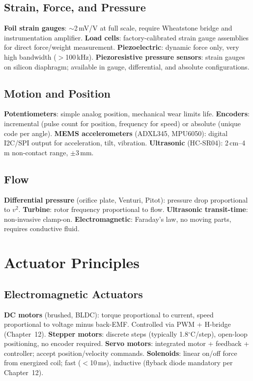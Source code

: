 \documentclass[11pt,letterpaper,twoside,openany]{book}
\newcommand{\degC}{\ensuremath{{}^{\circ}\text{C}}}
\begin{document}
\subsection{Strain, Force, and Pressure}
\textbf{Foil strain gauges}: $\sim$2\,mV/V at full scale, require Wheatstone bridge and instrumentation amplifier. \textbf{Load cells}: factory-calibrated strain gauge assemblies for direct force/weight measurement. \textbf{Piezoelectric}: dynamic force only, very high bandwidth ($>$100\,kHz). \textbf{Piezoresistive pressure sensors}: strain gauges on silicon diaphragm; available in gauge, differential, and absolute configurations.

\subsection{Motion and Position}
\textbf{Potentiometers}: simple analog position, mechanical wear limits life. \textbf{Encoders}: incremental (pulse count for position, frequency for speed) or absolute (unique code per angle). \textbf{MEMS accelerometers} (ADXL345, MPU6050): digital I2C/SPI output for acceleration, tilt, vibration. \textbf{Ultrasonic} (HC-SR04): 2\,cm--4\,m non-contact range, $\pm$3\,mm.

\subsection{Flow}
\textbf{Differential pressure} (orifice plate, Venturi, Pitot): pressure drop proportional to $v^2$. \textbf{Turbine}: rotor frequency proportional to flow. \textbf{Ultrasonic transit-time}: non-invasive clamp-on. \textbf{Electromagnetic}: Faraday's law, no moving parts, requires conductive fluid.

\section{Actuator Principles}

\subsection{Electromagnetic Actuators}
\textbf{DC motors} (brushed, BLDC): torque proportional to current, speed proportional to voltage minus back-EMF. Controlled via PWM + H-bridge (Chapter~12). \textbf{Stepper motors}: discrete steps (typically 1.8\degC{}/step), open-loop positioning, no encoder required. \textbf{Servo motors}: integrated motor + feedback + controller; accept position/velocity commands. \textbf{Solenoids}: linear on/off force from energized coil; fast ($<$10\,ms), inductive (flyback diode mandatory per Chapter~12).
\end{document}

